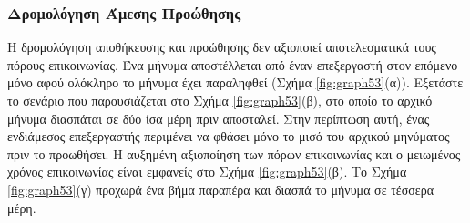 \documentclass[12pt,a4paper]{article} %
\begin{document}
\subsubsection{Δρομολόγηση Άμεσης Προώθησης}
Η δρομολόγηση αποθήκευσης και προώθησης δεν αξιοποιεί αποτελεσματικά τους 
πόρους επικοινωνίας. Ένα μήνυμα αποστέλλεται από έναν επεξεργαστή στον 
επόμενο μόνο αφού ολόκληρο το μήνυμα έχει παραληφθεί {(}Σχήμα \ref{fig:graph53}(α){)}. 
Εξετάστε το σενάριο που παρουσιάζεται στο Σχήμα \ref{fig:graph53}(β),
στο οποίο το αρχικό μήνυμα διασπάται σε δύο ίσα μέρη πριν αποσταλεί. Στην 
περίπτωση αυτή, ένας ενδιάμεσος επεξεργαστής περιμένει να φθάσει μόνο
το μισό του αρχικού μηνύματος πριν το προωθήσει. Η αυξημένη αξιοποίηση
των πόρων επικοινωνίας και ο μειωμένος χρόνος επικοινωνίας είναι εμφανείς
στο Σχήμα \ref{fig:graph53}(β). Το Σχήμα \ref{fig:graph53}(γ) προχωρά ένα 
βήμα παραπέρα και διασπά το μήνυμα σε τέσσερα μέρη.
\end{document}
